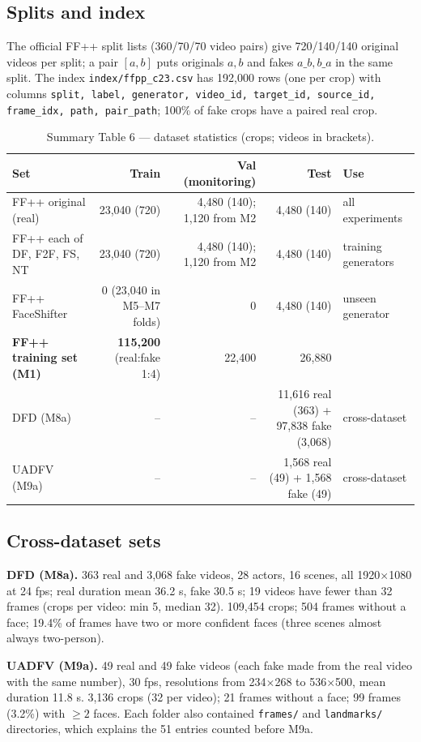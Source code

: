\documentclass[10pt,a4paper]{article}
\begin{document}
\subsection{Splits and index}
The official FF++ split lists (360/70/70 video pairs) give 720/140/140 original videos per split;
a pair \([a,b]\) puts originals \(a,b\) and fakes \(a\_b,b\_a\) in the same split. The index
\texttt{index/ffpp\_c23.csv} has 192,000 rows (one per crop) with columns \texttt{split, label,
generator, video\_id, target\_id, source\_id, frame\_idx, path, pair\_path}; 100\% of fake crops have a
paired real crop.

\begin{table}[H]\centering\small
\caption{Summary Table 6 --- dataset statistics (crops; videos in brackets).}\label{tab:datastats}
\begin{tabularx}{\linewidth}{@{}lRRRY@{}}
\toprule
Set & Train & Val (monitoring) & Test & Use\\
\midrule
FF++ original (real) & 23,040 (720) & 4,480 (140); 1,120 from M2 & 4,480 (140) & all experiments\\
FF++ each of DF, F2F, FS, NT & 23,040 (720) & 4,480 (140); 1,120 from M2 & 4,480 (140) & training generators\\
FF++ FaceShifter & 0 (23,040 in M5--M7 folds) & 0 & 4,480 (140) & unseen generator\\
\textbf{FF++ training set (M1)} & \textbf{115,200} (real:fake 1:4) & 22,400 & 26,880 & \\
DFD (M8a) & -- & -- & 11,616 real (363) + 97,838 fake (3,068) & cross-dataset\\
UADFV (M9a) & -- & -- & 1,568 real (49) + 1,568 fake (49) & cross-dataset\\
\bottomrule
\end{tabularx}
\end{table}

\subsection{Cross-dataset sets}
\textbf{DFD (M8a).} 363 real and 3,068 fake videos, 28 actors, 16 scenes, all 1920\(\times\)1080 at
24 fps; real duration mean 36.2 s, fake 30.5 s; 19 videos have fewer than 32 frames (crops per video:
min 5, median 32). 109,454 crops; 504 frames without a face; 19.4\% of frames have two or more
confident faces (three scenes almost always two-person).

\textbf{UADFV (M9a).} 49 real and 49 fake videos (each fake made from the real video with the same
number), 30 fps, resolutions from 234\(\times\)268 to 536\(\times\)500, mean duration 11.8 s. 3,136
crops (32 per video); 21 frames without a face; 99 frames (3.2\%) with \(\ge2\) faces. Each folder
also contained \texttt{frames/} and \texttt{landmarks/} directories, which explains the 51 entries
counted before M9a.
\end{document}

